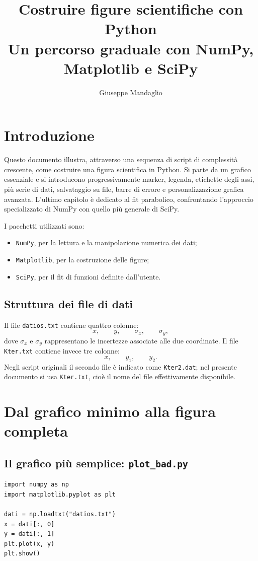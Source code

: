 \documentclass[11pt,a4paper]{book}
\title{Costruire figure scientifiche con Python\\
Un percorso graduale con NumPy, Matplotlib e SciPy}
\author{Giuseppe Mandaglio}
\date{}
\begin{document}
\maketitle
\tableofcontents

\chapter{Introduzione}
Questo documento illustra, attraverso una sequenza di script di complessità crescente, come costruire una figura scientifica in Python. Si parte da un grafico essenziale e si introducono progressivamente marker, legenda, etichette degli assi, più serie di dati, salvataggio su file, barre di errore e personalizzazione grafica avanzata. L'ultimo capitolo è dedicato al fit parabolico, confrontando l'approccio specializzato di NumPy con quello più generale di SciPy.

I pacchetti utilizzati sono:
\begin{itemize}
  \item \texttt{NumPy}, per la lettura e la manipolazione numerica dei dati;
  \item \texttt{Matplotlib}, per la costruzione delle figure;
  \item \texttt{SciPy}, per il fit di funzioni definite dall'utente.
\end{itemize}

\section{Struttura dei file di dati}
Il file \texttt{datios.txt} contiene quattro colonne:
\[
 x,\qquad y,\qquad \sigma_x,\qquad \sigma_y,
\]
dove $\sigma_x$ e $\sigma_y$ rappresentano le incertezze associate alle due coordinate. Il file \texttt{Kter.txt} contiene invece tre colonne:
\[
 x,\qquad y_1,\qquad y_2.
\]
Negli script originali il secondo file è indicato come \texttt{Kter2.dat}; nel presente documento si usa \texttt{Kter.txt}, cioè il nome del file effettivamente disponibile.

\chapter{Dal grafico minimo alla figura completa}

\section{Il grafico più semplice: \texttt{plot\_bad.py}}
\begin{lstlisting}
import numpy as np
import matplotlib.pyplot as plt

dati = np.loadtxt("datios.txt")
x = dati[:, 0]
y = dati[:, 1]
plt.plot(x, y)
plt.show()
\end{lstlisting}
\end{document}
